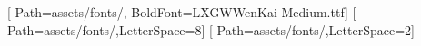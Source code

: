 [
  Path=assets/fonts/,
  BoldFont=LXGWWenKai-Medium.ttf]
\newCJKfontfamily{}[
  Path=assets/fonts/,LetterSpace=8]
\newCJKfontfamily{}[
  Path=assets/fonts/,LetterSpace=2]
\renewcommand{\namefont}{\paperfont\variantNameCJKfont}
\renewcommand{\sectionfont}{\headingfont\variantSectionCJKfont}
